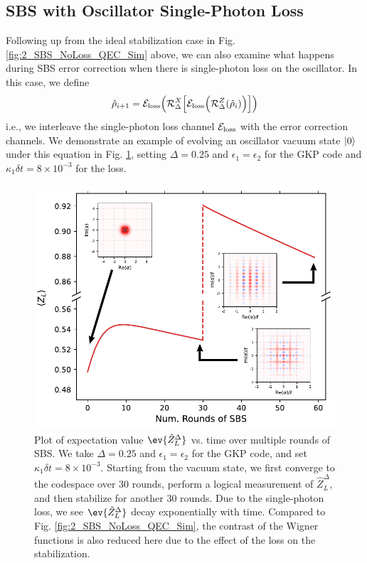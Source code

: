 \subsection{SBS with Oscillator Single-Photon Loss}
Following up from the ideal stabilization case in Fig. \ref{fig:2_SBS_NoLoss_QEC_Sim} above, we can also examine what happens during SBS error correction when there is single-photon loss on the oscillator. In this case, we define \begin{equation}
    \hat{\rho}_{i + 1} =  \mathcal{E}_{\rm loss}\Big(\mathcal{R}_\Delta^X\Big[\mathcal{E}_{\rm loss}\Big(\mathcal{R}_\Delta^Z(\hat{\rho}_i)\Big)\Big]\Big)
    \label{eq:2_SBS_Lossy_Kraus}
\end{equation}
i.e., we interleave the single-photon loss channel $\mathcal{E}_{\rm loss}$ with the error correction channels. We demonstrate an example of evolving an oscillator vacuum state $\lvert0\rangle$ under this equation in Fig. \ref{fig:2_SBS_Lossy_QEC_Sim}, setting $\Delta = 0.25$ and $\epsilon_1 = \epsilon_2$ for the GKP code and $\kappa_1\delta t = 8\times 10^{-3}$ for the loss.
\begin{figure}[h]
    \centering
    \includegraphics[width=0.85\linewidth]{Figures/2/SBS_Lossy_QEC_Sim.pdf}
    \caption[Simulated SBS stabilization of the GKP $\ket{+\tilde{Z}_L}$ state for an oscillator with single-photon loss.]{Plot of expectation value $\ev{\hat{Z}_L^\Delta}$ vs. time over multiple rounds of SBS. We take $\Delta = 0.25$ and $\epsilon_1 = \epsilon_2$ for the GKP code, and set $\kappa_1\delta t = 8\times 10^{-3}$. Starting from the vacuum state, we first converge to the codespace over 30 rounds, perform a logical measurement of $\hat{Z}_L^\Delta$, and then stabilize for another 30 rounds. Due to the single-photon loss, we see $\ev{\hat{Z}_L^\Delta}$ decay exponentially with time. Compared to Fig. \ref{fig:2_SBS_NoLoss_QEC_Sim}, the contrast of the Wigner functions is also reduced here due to the effect of the loss on the stabilization.}
    \label{fig:2_SBS_Lossy_QEC_Sim}
\end{figure}

